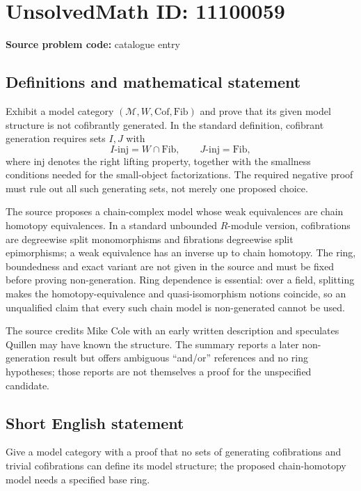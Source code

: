 \documentclass[11pt]{article}
\begin{document}
\section*{UnsolvedMath ID: 11100059}
\textbf{Source problem code:} catalogue entry
\subsection{Definitions and mathematical statement}
Exhibit a model category \((\mathcal M,W,\mathrm{Cof},\mathrm{Fib})\) and prove that its given model structure is not cofibrantly generated. In the standard definition, cofibrant generation requires sets \(I,J\) with
\[
 I\text{-inj}=W\cap\mathrm{Fib},\qquad
 J\text{-inj}=\mathrm{Fib},
\]
where inj denotes the right lifting property, together with the smallness conditions needed for the small-object factorizations. The required negative proof must rule out all such generating sets, not merely one proposed choice.

The source proposes a chain-complex model whose weak equivalences are chain homotopy equivalences. In a standard unbounded \(R\)-module version, cofibrations are degreewise split monomorphisms and fibrations degreewise split epimorphisms; a weak equivalence has an inverse up to chain homotopy. The ring, boundedness and exact variant are not given in the source and must be fixed before proving non-generation. Ring dependence is essential: over a field, splitting makes the homotopy-equivalence and quasi-isomorphism notions coincide, so an unqualified claim that every such chain model is non-generated cannot be used.

The source credits Mike Cole with an early written description and speculates Quillen may have known the structure. The summary reports a later non-generation result but offers ambiguous ``and/or'' references and no ring hypotheses; those reports are not themselves a proof for the unspecified candidate.
\subsection{Short English statement}
Give a model category with a proof that no sets of generating cofibrations and trivial cofibrations can define its model structure; the proposed chain-homotopy model needs a specified base ring.
\end{document}

